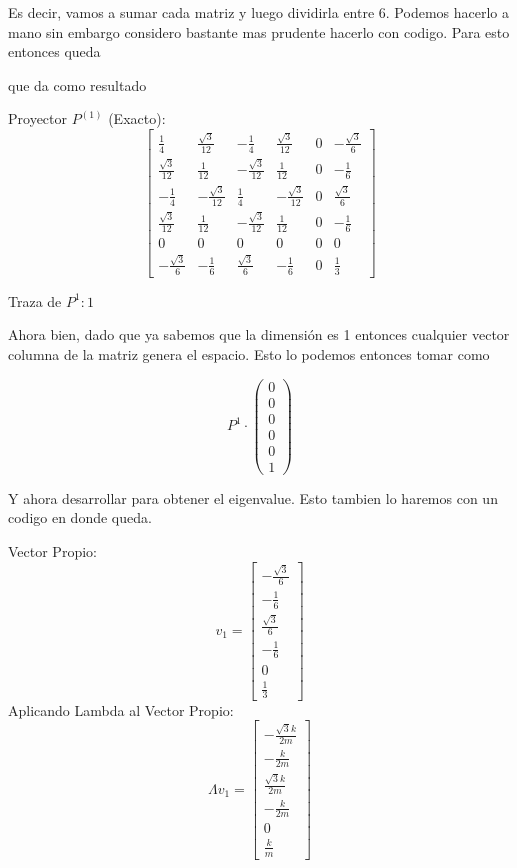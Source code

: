 \documentclass[12pt]{amsart}
\begin{document}
Es decir, vamos a sumar cada matriz y luego dividirla entre 6. Podemos hacerlo a mano sin embargo considero bastante mas prudente hacerlo con codigo. Para esto entonces queda



que da como resultado

Proyector $P^{(1)}$ (Exacto):
$$\left[\begin{matrix}\frac{1}{4} & \frac{\sqrt{3}}{12} & - \frac{1}{4} & \frac{\sqrt{3}}{12} & 0 & - \frac{\sqrt{3}}{6}\\\frac{\sqrt{3}}{12} & \frac{1}{12} & - \frac{\sqrt{3}}{12} & \frac{1}{12} & 0 & - \frac{1}{6}\\- \frac{1}{4} & - \frac{\sqrt{3}}{12} & \frac{1}{4} & - \frac{\sqrt{3}}{12} & 0 & \frac{\sqrt{3}}{6}\\\frac{\sqrt{3}}{12} & \frac{1}{12} & - \frac{\sqrt{3}}{12} & \frac{1}{12} & 0 & - \frac{1}{6}\\0 & 0 & 0 & 0 & 0 & 0\\- \frac{\sqrt{3}}{6} & - \frac{1}{6} & \frac{\sqrt{3}}{6} & - \frac{1}{6} & 0 & \frac{1}{3}\end{matrix}\right]$$

Traza de $P^1: 1$

Ahora bien, dado que ya sabemos que la dimensión es 1 entonces cualquier vector columna de la matriz genera el espacio. Esto lo podemos entonces tomar como

$$P^{1} \cdot \begin{pmatrix}0 \\ 0 \\ 0 \\ 0 \\ 0 \\ 1\end{pmatrix}$$

Y ahora desarrollar para obtener el eigenvalue. Esto tambien lo haremos con un codigo en donde queda.



Vector Propio:
$$v_1 = \left[\begin{matrix}- \frac{\sqrt{3}}{6}\\- \frac{1}{6}\\\frac{\sqrt{3}}{6}\\- \frac{1}{6}\\0\\\frac{1}{3}\end{matrix}\right]$$
Aplicando Lambda al Vector Propio:
$$\Lambda v_1 = \left[\begin{matrix}- \frac{\sqrt{3} k}{2 m}\\- \frac{k}{2 m}\\\frac{\sqrt{3} k}{2 m}\\- \frac{k}{2 m}\\0\\\frac{k}{m}\end{matrix}\right]$$
\end{document}
